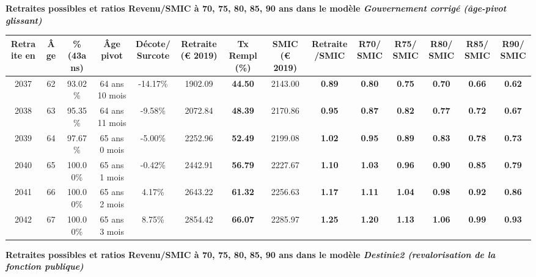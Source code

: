  \vspace{0.1cm} 
{\bf \noindent Retraites possibles et ratios Revenu/SMIC à 70, 75, 80, 85, 90 ans dans le modèle \emph{Gouvernement corrigé (âge-pivot glissant)}}  
 
\begin{adjustbox}{max width=\textwidth} 
\begin{tabular}[htb]{|c|c||c|c|c||c|c||c|c||c|c|c|c|c|} 
\hline 
 Retraite en &  Âge &  \%(43ans) &  Âge pivot &  Décote/Surcote &  Retraite (\euro{} 2019) &  Tx Rempl(\%) &  SMIC (\euro{} 2019) &  Retraite/SMIC &  R70/SMIC &  R75/SMIC &  R80/SMIC &  R85/SMIC &  R90/SMIC \\ 
\hline \hline 
 2037 &  62 &  93.02\% &  64 ans 10 mois &  -14.17\% &  1902.09 &  {\bf 44.50} &  2143.00 &  {\bf {\color{red} 0.89}} &  {\bf {\color{red} 0.80}} &  {\bf {\color{red} 0.75}} &  {\bf {\color{red} 0.70}} &  {\bf {\color{red} 0.66}} &  {\bf {\color{red} 0.62}} \\ 
\hline 
 2038 &  63 &  95.35\% &  64 ans 11 mois &  -9.58\% &  2072.84 &  {\bf 48.39} &  2170.86 &  {\bf {\color{red} 0.95}} &  {\bf {\color{red} 0.87}} &  {\bf {\color{red} 0.82}} &  {\bf {\color{red} 0.77}} &  {\bf {\color{red} 0.72}} &  {\bf {\color{red} 0.67}} \\ 
\hline 
 2039 &  64 &  97.67\% &  65 ans 0 mois &  -5.00\% &  2252.96 &  {\bf 52.49} &  2199.08 &  {\bf 1.02} &  {\bf {\color{red} 0.95}} &  {\bf {\color{red} 0.89}} &  {\bf {\color{red} 0.83}} &  {\bf {\color{red} 0.78}} &  {\bf {\color{red} 0.73}} \\ 
\hline 
 2040 &  65 &  100.00\% &  65 ans 1 mois &  -0.42\% &  2442.91 &  {\bf 56.79} &  2227.67 &  {\bf 1.10} &  {\bf 1.03} &  {\bf {\color{red} 0.96}} &  {\bf {\color{red} 0.90}} &  {\bf {\color{red} 0.85}} &  {\bf {\color{red} 0.79}} \\ 
\hline 
 2041 &  66 &  100.00\% &  65 ans 2 mois &  4.17\% &  2643.22 &  {\bf 61.32} &  2256.63 &  {\bf 1.17} &  {\bf 1.11} &  {\bf 1.04} &  {\bf {\color{red} 0.98}} &  {\bf {\color{red} 0.92}} &  {\bf {\color{red} 0.86}} \\ 
\hline 
 2042 &  67 &  100.00\% &  65 ans 3 mois &  8.75\% &  2854.42 &  {\bf 66.07} &  2285.97 &  {\bf 1.25} &  {\bf 1.20} &  {\bf 1.13} &  {\bf 1.06} &  {\bf {\color{red} 0.99}} &  {\bf {\color{red} 0.93}} \\ 
\hline 
\hline 
\end{tabular} 
\end{adjustbox} 
 
 \vspace{0.1cm} 
{\bf \noindent Retraites possibles et ratios Revenu/SMIC à 70, 75, 80, 85, 90 ans dans le modèle \emph{Destinie2 (revalorisation de la fonction publique)}}  
 
